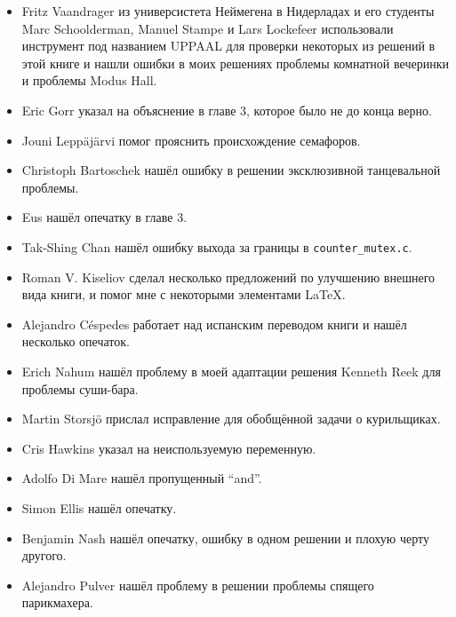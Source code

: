 \begin{itemize}
\item Fritz Vaandrager из универсистета Неймегена в Нидерладах и его студенты
Marc Schoolderman, Manuel Stampe и Lars Lockefeer использовали инструмент под
названием UPPAAL для проверки некоторых из решений в этой книге и нашли
ошибки в моих решениях проблемы комнатной вечеринки и проблемы Modus Hall.

\item Eric Gorr указал на объяснение в главе 3, которое было не до конца верно.

\item Jouni Lepp\"{a}j\"{a}rvi помог прояснить происхождение семафоров.

\item Christoph Bartoschek нашёл ошибку в решении эксклюзивной танцевальной
проблемы.

\item Eus нашёл опечатку в главе 3.

\item Tak-Shing Chan нашёл ошибку выхода за границы в {\tt counter\_mutex.c}.

\item Roman V. Kiseliov сделал несколько предложений по улучшению внешнего вида
книги, и помог мне с некоторыми элементами \LaTeX.

\item Alejandro C\'{e}spedes работает над испанским переводом книги и нашёл
несколько опечаток.

\item Erich Nahum нашёл проблему в моей адаптации решения Kenneth Reek для
проблемы суши-бара.

\item Martin Storsj\"{o} прислал исправление для обобщённой
задачи о курильщиках.

\item Cris Hawkins указал на неиспользуемую переменную.

\item Adolfo Di Mare нашёл пропущенный ``and''.

\item Simon Ellis нашёл опечатку.

\item Benjamin Nash нашёл опечатку, ошибку в одном решении
и плохую черту другого.

\item Alejandro Pulver нашёл проблему в решении проблемы спящего парикмахера.

\end{itemize}
